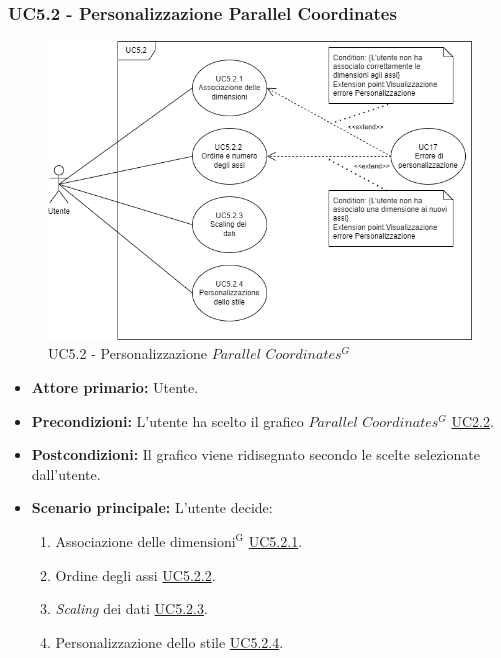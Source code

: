 \subsubsection{UC5.2 - Personalizzazione Parallel Coordinates}
\label{sec:UC5.2}
\begin{figure}[h!]
	\centering
	\includegraphics[scale=0.60]{../../assets/personalizzazioneParallelCoordinates.png}
	\caption{UC5.2 - Personalizzazione $Parallel$ $Coordinates^{G}$}
\end{figure}
\begin{itemize}
    \item \textbf{Attore primario:} Utente.
	\item \textbf{Precondizioni:} L'utente ha scelto il grafico $Parallel$ $Coordinates^{G}$ \hyperref[sec:UC2.2]{UC2.2}.
	\item \textbf{Postcondizioni:} Il grafico viene ridisegnato secondo le scelte selezionate dall'utente.
	\item \textbf{Scenario principale:} L'utente decide:
	\begin{enumerate}
        \item Associazione delle ${\mathrm{dimensioni^{G}}}$ \hyperref[sec:UC5.2.1]{UC5.2.1}.
        \item Ordine degli assi \hyperref[sec:UC5.2.2]{UC5.2.2}.
        \item \textit{Scaling} dei dati \hyperref[sec:UC5.2.3]{UC5.2.3}.
        \item Personalizzazione dello stile \hyperref[sec:UC5.2.4]{UC5.2.4}.
    \end{enumerate}
\end{itemize}

